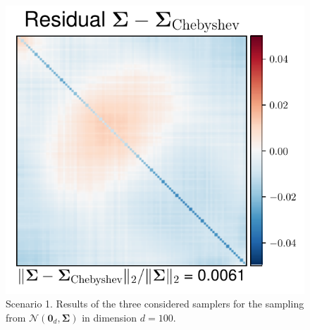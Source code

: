 \documentclass[aspectratio=169]{beamer}
\newcommand{\B}[1]{\mathbf{#1}} %
\begin{document}
\begin{frame}
\begin{figure}
    \mbox{{\includegraphics[scale=0.4]{src/images/simu1_ex1_A_Cheby.pdf}}}
  \caption{Scenario 1. Results of the three considered samplers for the sampling from $\mathcal{N}(\B{0}_d,\B{\Sigma})$ in dimension $d = 100$.}
  \end{figure}
\end{frame}
\end{document}
